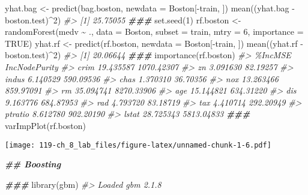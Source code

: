 \documentclass[
]{book}
\newenvironment{Shaded}{\begin{snugshade}}{\end{snugshade}}
\newcommand{\AttributeTok}[1]{\textcolor[rgb]{0.77,0.63,0.00}{#1}}
\newcommand{\CommentTok}[1]{\textcolor[rgb]{0.56,0.35,0.01}{\textit{#1}}}
\newcommand{\ConstantTok}[1]{\textcolor[rgb]{0.00,0.00,0.00}{#1}}
\newcommand{\DecValTok}[1]{\textcolor[rgb]{0.00,0.00,0.81}{#1}}
\newcommand{\DocumentationTok}[1]{\textcolor[rgb]{0.56,0.35,0.01}{\textbf{\textit{#1}}}}
\newcommand{\FunctionTok}[1]{\textcolor[rgb]{0.00,0.00,0.00}{#1}}
\newcommand{\NormalTok}[1]{#1}
\newcommand{\OtherTok}[1]{\textcolor[rgb]{0.56,0.35,0.01}{#1}}
\newcommand{\SpecialCharTok}[1]{\textcolor[rgb]{0.00,0.00,0.00}{#1}}
\begin{document}
\begin{Shaded}
\begin{Highlighting}[]
\NormalTok{yhat.bag }\OtherTok{\textless{}{-}} \FunctionTok{predict}\NormalTok{(bag.boston, }\AttributeTok{newdata =}\NormalTok{ Boston[}\SpecialCharTok{{-}}\NormalTok{train, ])}
\FunctionTok{mean}\NormalTok{((yhat.bag }\SpecialCharTok{{-}}\NormalTok{ boston.test)}\SpecialCharTok{\^{}}\DecValTok{2}\NormalTok{)}
\CommentTok{\#\textgreater{} [1] 25.75055}
\DocumentationTok{\#\#\#}
\FunctionTok{set.seed}\NormalTok{(}\DecValTok{1}\NormalTok{)}
\NormalTok{rf.boston }\OtherTok{\textless{}{-}} \FunctionTok{randomForest}\NormalTok{(medv }\SpecialCharTok{\textasciitilde{}}\NormalTok{ ., }\AttributeTok{data =}\NormalTok{ Boston,}
                          \AttributeTok{subset =}\NormalTok{ train, }\AttributeTok{mtry =} \DecValTok{6}\NormalTok{, }\AttributeTok{importance =} \ConstantTok{TRUE}\NormalTok{)}
\NormalTok{yhat.rf }\OtherTok{\textless{}{-}} \FunctionTok{predict}\NormalTok{(rf.boston, }\AttributeTok{newdata =}\NormalTok{ Boston[}\SpecialCharTok{{-}}\NormalTok{train, ])}
\FunctionTok{mean}\NormalTok{((yhat.rf }\SpecialCharTok{{-}}\NormalTok{ boston.test)}\SpecialCharTok{\^{}}\DecValTok{2}\NormalTok{)}
\CommentTok{\#\textgreater{} [1] 20.06644}
\DocumentationTok{\#\#\#}
\FunctionTok{importance}\NormalTok{(rf.boston)}
\CommentTok{\#\textgreater{}           \%IncMSE IncNodePurity}
\CommentTok{\#\textgreater{} crim    19.435587    1070.42307}
\CommentTok{\#\textgreater{} zn       3.091630      82.19257}
\CommentTok{\#\textgreater{} indus    6.140529     590.09536}
\CommentTok{\#\textgreater{} chas     1.370310      36.70356}
\CommentTok{\#\textgreater{} nox     13.263466     859.97091}
\CommentTok{\#\textgreater{} rm      35.094741    8270.33906}
\CommentTok{\#\textgreater{} age     15.144821     634.31220}
\CommentTok{\#\textgreater{} dis      9.163776     684.87953}
\CommentTok{\#\textgreater{} rad      4.793720      83.18719}
\CommentTok{\#\textgreater{} tax      4.410714     292.20949}
\CommentTok{\#\textgreater{} ptratio  8.612780     902.20190}
\CommentTok{\#\textgreater{} lstat   28.725343    5813.04833}
\DocumentationTok{\#\#\#}
\FunctionTok{varImpPlot}\NormalTok{(rf.boston)}
\end{Highlighting}
\end{Shaded}

\texttt{[image: 119-ch\_8\_lab\_files/figure-latex/unnamed-chunk-1-6.pdf]}

\begin{Shaded}
\begin{Highlighting}[]

\DocumentationTok{\#\# Boosting}

\DocumentationTok{\#\#\#}
\FunctionTok{library}\NormalTok{(gbm)}
\CommentTok{\#\textgreater{} Loaded gbm 2.1.8}
\end{Highlighting}
\end{Shaded}
\end{document}

